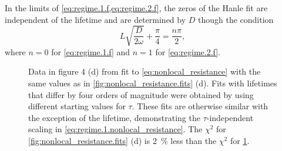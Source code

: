 In the limits of \cref{eq:regime.1.f,eq:regime.2.f},
the zeros of the Hanle fit are independent of the lifetime
and are determined by $D$ though the condition
\begin{equation}
  L \sqrt{\frac{D}{2 ω}} + \frac{π}{4} = \frac{n π}{2} ,
\end{equation}
where $n = 0$ for \cref{eq:regime.1.f} and $n = 1$ for \cref{eq:regime.2.f}.

\begin{figure}[!b]
  \caption{
    Data in figure 4 (d) from \cite{PhysRevLett.105.167202}
    fit to \cref{eq:nonlocal_resistance}
    with the same values as in
    \cref{fig:nonlocal_resistance.fits} (d).
    Fits with lifetimes that differ by four orders of magnitude
    were obtained by using different starting values for $τ$.
    These fits are otherwise similar with the exception of the lifetime,
    demonstrating the $τ$-independent scaling in
    \cref{eq:regime.1.nonlocal_resistance}.
    The $χ^2$ for \cref{fig:nonlocal_resistance.fits} (d)
    is \SI{2}{\percent} less than the $χ^2$ for
    \cref{fig:nonlocal_resistance.large_lifetime}.
  }
  \label{fig:nonlocal_resistance.large_lifetime}

\end{figure}
